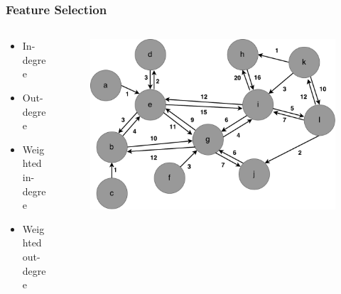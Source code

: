 \begin{frame}
\frametitle{Feature Selection}
\begin{columns}
	\begin{column}{0.35\textwidth}
		\begin{itemize}
			\item In-degree 
			\item Out-degree
			\item Weighted in-degree 
			\item Weighted out-degree
		\end{itemize}
	\end{column}
	
	\begin{column}{0.65\textwidth}
		\begin{figure}
			\includegraphics[scale=0.3]{graphics/directed_network.pdf}
		\end{figure}
	\end{column}
\end{columns}
\end{frame}
	
